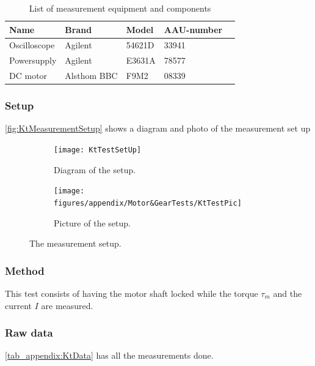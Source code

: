 \begin{table}[htbp]
	\centering
	\caption{List of measurement equipment and components}\label{tab_appendix:KtSetUp}
	
	\begin{tabularx}{\textwidth}{lXXXX}
		Name 				& Brand	& Model & AAU-number									\\ \toprule \rowcolor{lightGrey}
		Oscilloscope	& Agilent & 54621D & 33941 	\\
		Powersupply	& Agilent & E3631A & 78577\\ \rowcolor{lightGrey}
		DC motor & Alsthom BBC & F9M2& 08339
	\end{tabularx}
\end{table}

\subsubsection*{Setup}
\autoref{fig:KtMeasurementSetup} shows a diagram and photo of the measurement set up
\begin{figure}[htbp]
	\centering
	\begin{subfigure}{0.50\textwidth}
			\texttt{[image: KtTestSetUp]}
		\caption{Diagram of the setup.} \label{fig:KtMeasurementDiagram}
	\end{subfigure}
	\begin{subfigure}{0.40\textwidth}
		\texttt{[image: figures/appendix/Motor\&GearTests/KtTestPic]}
		\caption{Picture of the setup.} \label{fig:KtMeasurementPictures}
	\end{subfigure}
	\caption{The measurement setup.} \label{fig:KtMeasurementSetup}   
\end{figure}

\subsubsection*{Method}
This test consists of having the motor shaft locked while the torque $\tau_m$ and the current $I$ are measured.


\subsubsection*{Raw data}
\autoref{tab_appendix:KtData} has all the measurements done.

